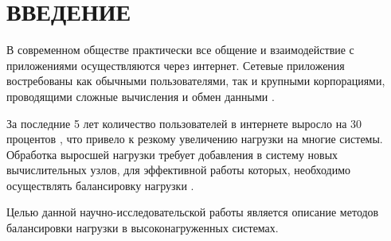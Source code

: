 \chapter*{ВВЕДЕНИЕ}

В современном обществе практически все общение и взаимодействие с приложениями осуществляются через интернет. Сетевые приложения востребованы как обычными пользователями, так и крупными корпорациями, проводящими сложные вычисления и обмен данными \cite{webact}.

За последние 5 лет количество пользователей в интернете выросло на 30 процентов \cite{statistics}, что привело к резкому увеличению нагрузки на многие системы. Обработка выросшей нагрузки требует добавления в систему новых вычислительных узлов, для эффективной работы которых, необходимо осуществлять балансировку нагрузки \cite{strategies, com_analysis, gaud, part_algos}.

Целью данной научно-исследовательской работы является описание методов балансировки нагрузки в высоконагруженных системах.


